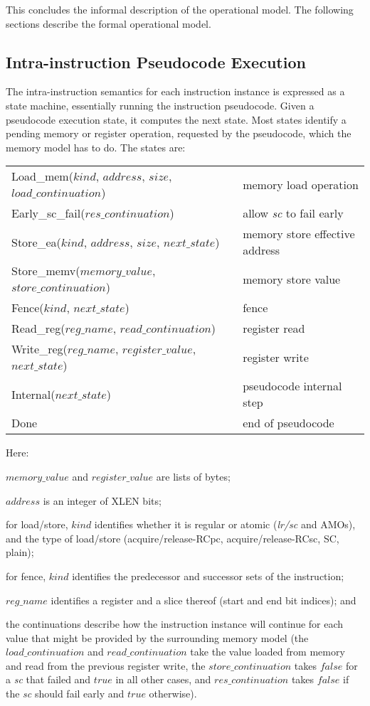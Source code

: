 This concludes the informal description of the operational model.
The following sections describe the formal operational model.

\subsection{Intra-instruction Pseudocode Execution}
The intra-instruction semantics for each instruction instance is expressed as a state machine, essentially running the instruction pseudocode.
Given a pseudocode execution state, it computes the next state.  Most
states identify a pending memory or register operation, requested by
the pseudocode, which the memory model has to do.  The
states are:

\begin{center}
\begin{tabular}{l@{ \quad-\quad }l}
{\sc Load\_mem}($kind$, $address$, $size$, $load\_continuation$)
    & memory load operation\\
{\sc Early\_sc\_fail}($res\_continuation$)
    & allow {\em sc} to fail early\\
{\sc Store\_ea}($kind$, $address$, $size$, $next\_state$)
    & memory store effective address\\
{\sc Store\_memv}($memory\_value$, $store\_continuation$)
    & memory store value\\
{\sc Fence}($kind$, $next\_state$)
    & fence\\
{\sc Read\_reg}($reg\_name$, $read\_continuation$)
    & register read\\
{\sc Write\_reg}($reg\_name$, $register\_value$, $next\_state$)
    & register write\\
{\sc Internal}($next\_state$)
    & pseudocode internal step\\
{\sc Done}
    & end of pseudocode\\
\end{tabular}
\end{center}
Here:
\begin{tightlist}
\item $memory\_value$ and $register\_value$ are lists of bytes;
\item $address$ is an integer of XLEN bits;
\item for load/store, $kind$ identifies whether it is regular or atomic ({\em lr/sc} and AMOs), and the type of load/store (acquire/release-RCpc, acquire/release-RCsc, SC, plain);
\item for fence, $kind$ identifies the predecessor and successor sets of the instruction;
\item $reg\_name$ identifies a register and a slice thereof (start and
  end bit indices); and
\item the continuations describe how the instruction instance will continue for each value that might be provided by the surrounding memory model (the $load\_continuation$ and $read\_continuation$ take the value loaded from memory and read from the previous register write, the $store\_continuation$ takes $false$ for a {\em sc} that failed and $true$ in all other cases, and $res\_continuation$ takes $false$ if the {\em sc} should fail early and $true$ otherwise).
\end{tightlist}

